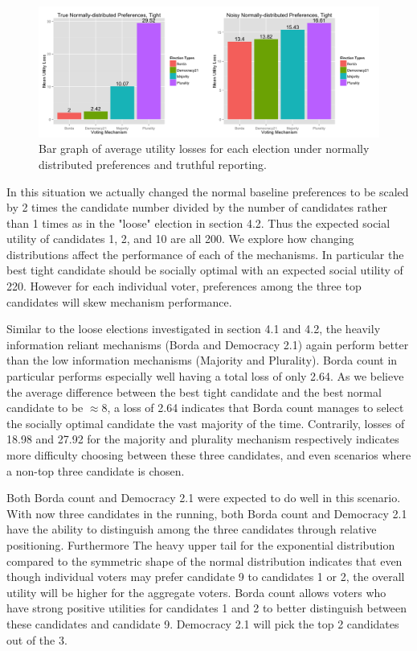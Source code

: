 \documentclass[11pt]{scrartcl}
\begin{document}
\begin{figure}[H]\center
\includegraphics[scale=0.38]{normal_tight.png}
\caption{Bar graph of average utility losses for each election under normally distributed preferences and truthful reporting.}
\end{figure}

In this situation we actually changed the normal baseline preferences to be scaled by 2 times the candidate number divided by the number of candidates rather than 1 times as in the "loose" election in section 4.2. Thus the expected social utility of candidates 1, 2, and 10 are all 200. We explore how changing distributions affect the performance of each of the mechanisms. In particular the best tight candidate should be socially optimal with an expected social utility of 220. However for each individual voter, preferences among the three top candidates will skew mechanism performance.

Similar to the loose elections investigated in section 4.1 and 4.2, the heavily information reliant mechanisms (Borda and Democracy 2.1) again perform better than the low information mechanisms (Majority and Plurality). Borda count in particular performs especially well having a total loss of only 2.64. As we believe the average difference between the best tight candidate and the best normal candidate to be $\approx 8$, a loss of 2.64 indicates that Borda count manages to select the socially optimal candidate the vast majority of the time. Contrarily, losses of 18.98 and 27.92 for the majority and plurality mechanism respectively indicates more difficulty choosing between these three candidates, and even scenarios where a non-top three candidate is chosen.

Both Borda count and Democracy 2.1 were expected to do well in this scenario. With now three candidates in the running, both Borda count and Democracy 2.1 have the ability to distinguish among the three candidates through relative positioning. Furthermore The heavy upper tail for the exponential distribution compared to the symmetric shape of the normal distribution indicates that even though individual voters may prefer candidate 9 to candidates 1 or 2, the overall utility will be higher for the aggregate voters. Borda count allows voters who have strong positive utilities for candidates 1 and 2 to better distinguish between these candidates and candidate 9. Democracy 2.1 will pick the top 2 candidates out of the 3.
\end{document}
